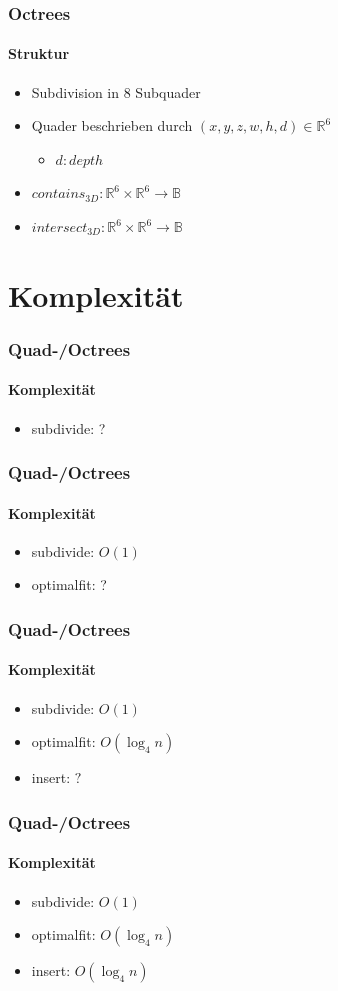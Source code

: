 \documentclass{beamer}
\begin{document}
\begin{frame}
  \frametitle{Octrees}
  \framesubtitle{Struktur}
  \begin{itemize}
    \item Subdivision in 8 Subquader
    \item Quader beschrieben durch $(x,y,z,w,h,d) \in \mathbb{R}^6$
    \begin{itemize}
      \item $d: depth$
    \end{itemize}
    \item ${contains}_{3D}: \mathbb{R}^6 \times \mathbb{R}^6 \rightarrow \mathbb{B}$
    \item ${intersect}_{3D}: \mathbb{R}^6 \times \mathbb{R}^6 \rightarrow \mathbb{B}$
  \end{itemize}
\end{frame}

\section{Komplexität}

\begin{frame}
  \frametitle{Quad-/Octrees}
  \framesubtitle{Komplexität}
  \begin{itemize}
    \item subdivide: ?
  \end{itemize}
\end{frame}

\begin{frame}
  \frametitle{Quad-/Octrees}
  \framesubtitle{Komplexität}
  \begin{itemize}
    \item subdivide: $O(1)$
    \item optimalfit: ?
  \end{itemize}
\end{frame}

\begin{frame}
  \frametitle{Quad-/Octrees}
  \framesubtitle{Komplexität}
  \begin{itemize}
    \item subdivide: $O(1)$
    \item optimalfit: $O(\log_4 n)$
    \item insert: $?$
  \end{itemize}
\end{frame}

\begin{frame}
  \frametitle{Quad-/Octrees}
  \framesubtitle{Komplexität}
  \begin{itemize}
    \item subdivide: $O(1)$
    \item optimalfit: $O(\log_4 n)$
    \item insert: $O(\log_4 n)$
  \end{itemize}
\end{frame}
\end{document}
